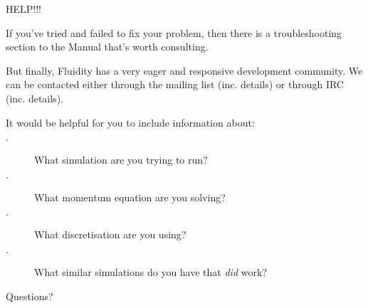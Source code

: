 \documentclass[professionalfonts, 8pt]{beamer}
\begin{document}

\begin{frame}{HELP!!!}

If you've tried and failed to fix your problem, then there is a troubleshooting section to the Manual that's worth consulting.

\vspace{1ex}
But finally, Fluidity has a very eager and responsive development community.  
We can be contacted either through the mailing list (inc. details)
or through IRC (inc. details).

\vspace{1ex}
It would be helpful for you to include information about:
\begin{description}
 \item[$\cdot$] What simulation are you trying to run?
 \item[$\cdot$] What momentum equation are you solving?
 \item[$\cdot$] What discretisation are you using?
 \item[$\cdot$] What similar simulations do you have that {\it did} work?
 
\end{description}
\end{frame}

\begin{frame}
\begin{center}
{\Huge Questions?}
\end{center}
\end{frame}
\end{document}
